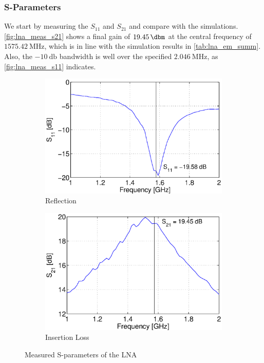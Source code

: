 \documentclass[a4paper]{article}        %
\begin{document}
  \subsubsection{S-Parameters}
  \label{sub:sparams}
  We start by measuring the $S_{11}$ and $S_{21}$ and compare with the simulations.
  \autoref{fig:lna_meas_s21} shows a final gain of $\SI{19.45}{\dbm}$ at the central frequency of $\SI{1575.42}{\mega\hertz}$, which is in line with the simulation results in \autoref{tab:lna_em_summ}.
  Also, the $\SI{-10}{\decibel}$ bandwidth is well over the specified $\SI{2.046}{\mega\hertz}$, as \autoref{fig:lna_meas_s11} indicates.
  \begin{figure}[H]
    \centering
    \begin{subfigure}{0.5\textwidth}
      \centering
      \includegraphics[width=\textwidth]{fig/LNA/s11_lna.eps}
      \caption{Reflection}
      \label{fig:lna_meas_s11}
    \end{subfigure}%
    \begin{subfigure}{0.5\textwidth}
      \centering
      \includegraphics[width=\textwidth]{fig/LNA/s21_lna.eps}
      \caption{Insertion Loss}
      \label{fig:lna_meas_s21}
    \end{subfigure}
    \caption{Measured S-parameters of the LNA}
    \label{fig:lna_meas_sparam}
  \end{figure}
\end{document}
